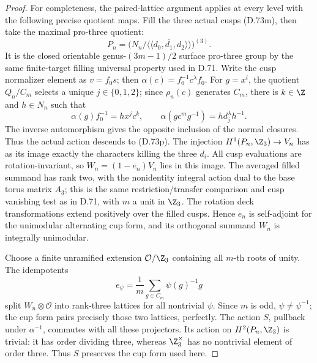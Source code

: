 \begin{proof}
For completeness, the paired-lattice argument applies at
every level with the following precise quotient maps.
Fill the three actual cusps (D.73m), then take the
maximal pro-three quotient:
\[
 P_n=\bigl(N_n/
       \overline{\langle\!\langle d_0,d_1,d_2\rangle\!\rangle}
                                                  \bigr)^{(3)} .
                                                               \tag{D.73p}
\]
It is the closed orientable genus-\((3m-1)/2\)
surface pro-three group by the same finite-target
filling universal property used in D.71.
Write the cusp normalizer element as \(v=f_0s\);
then \(\alpha(c)=f_0^{-1}c^\lambda f_0\).
For \(g=x^i\), the quotient \(Q_n/C_m\) selects a unique
\(j\in\{0,1,2\}\); since \(\rho_n(c)\) generates \(C_m\),
there is \(k\in\Z\) and \(h\in N_n\) such that
\[
 \alpha(g)f_0^{-1}=h x^j c^k,\qquad
 \alpha(g c^m g^{-1})=h d_j^\lambda h^{-1}.
                                                               \tag{D.73q}
\]
The inverse automorphism gives the opposite inclusion
of the normal closures. Thus the actual action descends
to (D.73p).
The injection \(H^1(P_n,\Z_3)\to V_n\) has as its image
exactly the characters killing the three \(d_i\).
All cusp evaluations are rotation-invariant, so
\(W_n=(1-e_n)V_n\) lies in this image.
The averaged filled summand has rank two, with the
nonidentity integral action dual to the base torus
matrix \(A_3\); this is the same restriction/transfer
comparison and cusp vanishing test as in D.71,
with \(m\) a unit in \(\Z_3\).
The rotation deck transformations extend positively
over the filled cusps. Hence \(e_n\) is self-adjoint
for the unimodular alternating cup form, and its
orthogonal summand \(W_n\) is integrally unimodular.

Choose a finite unramified extension \(\mathcal O/\Z_3\)
containing all \(m\)-th roots of unity. The idempotents
\[
       e_\psi=\frac1m\sum_{g\in C_m}\psi(g)^{-1}g
                                                               \tag{D.73r}
\]
split \(W_n\otimes\mathcal O\) into rank-three lattices
for all nontrivial \(\psi\).
Since \(m\) is odd, \(\psi\ne\psi^{-1}\); the cup form
pairs precisely those two lattices, perfectly.
The action \(S\), pullback under \(\alpha^{-1}\),
commutes with all these projectors.
Its action on \(H^2(P_n,\Z_3)\) is trivial:
it has order dividing three, whereas \(\Z_3^\times\)
has no nontrivial element of order three.
Thus \(S\) preserves the cup form used here.


\end{proof}
